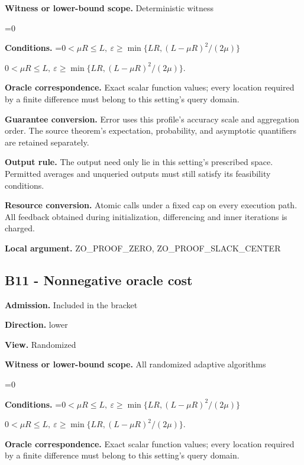 \documentclass[10pt,a4paper]{article}
\newcommand{\AtlasMath}[1]{\par\begingroup\centering\setbox0=\hbox{$\displaystyle #1$}\ifdim\wd0>1.4\linewidth\typeout{ATLAS WIDE FORMULA: \the\wd0}\fi\ifdim\wd0>\linewidth\resizebox{\linewidth}{!}{\box0}\else\box0\fi\par\endgroup}
\newcommand{\AtlasInlineMath}[1]{\begingroup\setbox0=\hbox{$#1$}\ifdim\wd0>.4\linewidth\endgroup\AtlasMath{#1}\else\endgroup$#1$\fi}
\begin{document}
\textbf{Witness or lower-bound scope.} Deterministic witness



\AtlasMath{0}


\textbf{Conditions.} \AtlasInlineMath{0<\mu R\le L,\ \varepsilon\ge\min\{LR,(L-\mu R)^2/(2\mu)\}}.



\textbf{Oracle correspondence.} Exact scalar function values; every location required by a finite difference must belong to this setting's query domain.



\textbf{Guarantee conversion.} Error uses this profile's accuracy scale and aggregation order. The source theorem's expectation, probability, and asymptotic quantifiers are retained separately.



\textbf{Output rule.} The output need only lie in this setting's prescribed space. Permitted averages and unqueried outputs must still satisfy its feasibility conditions.



\textbf{Resource conversion.} Atomic calls under a fixed cap on every execution path. All feedback obtained during initialization, differencing and inner iterations is charged.



\textbf{Local argument.} ZO\_PROOF\_ZERO, ZO\_PROOF\_SLACK\_CENTER



\subsection{B11 - Nonnegative oracle cost}


\textbf{Admission.} Included in the bracket



\textbf{Direction.} lower



\textbf{View.} Randomized



\textbf{Witness or lower-bound scope.} All randomized adaptive algorithms



\AtlasMath{0}


\textbf{Conditions.} \AtlasInlineMath{0<\mu R\le L,\ \varepsilon\ge\min\{LR,(L-\mu R)^2/(2\mu)\}}.



\textbf{Oracle correspondence.} Exact scalar function values; every location required by a finite difference must belong to this setting's query domain.
\end{document}
